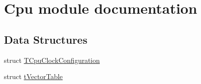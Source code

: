\hypertarget{group___cpu__module}{}\section{Cpu module documentation}
\label{group___cpu__module}
\subsection*{Data Structures}
\begin{DoxyCompactItemize}
\item 
struct \hyperlink{struct_t_cpu_clock_configuration}{T\+Cpu\+Clock\+Configuration}
\item 
struct \hyperlink{structt_vector_table}{t\+Vector\+Table}
\end{DoxyCompactItemize}
